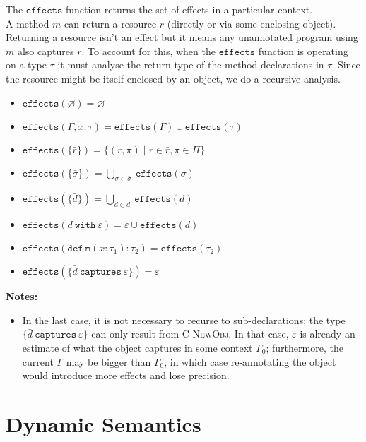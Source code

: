 \documentclass{llncs}
\newcommand{\keywadj}[1]{\mathtt{#1}}
\newcommand{\keyw}[1]{\keywadj{#1}~}
\begin{document}
\noindent
The $\keywadj{effects}$ function returns the set of effects in a particular context. \\

\noindent
A method $m$ can return a resource $r$ (directly or via some enclosing object). Returning a resource isn't an effect but it means any unannotated program using $m$ also captures $r$. To account for this, when the $\keywadj{effects}$ function is operating on a type $\tau$ it must analyse the return type of the method declarations in $\tau$. Since the resource might be itself enclosed by an object, we do a recursive analysis.

\begin{itemize}
	\item $\keywadj{effects}(\varnothing) = \varnothing$
	\item $\keywadj{effects}(\Gamma, x : \tau) = \keywadj{effects}(\Gamma) \cup \keywadj{effects}(\tau)$
	\item $\keywadj{effects}(\{\bar r\}) = \{ (r, \pi) \mid r \in \bar r, \pi \in \Pi \}$
	\item $\keywadj{effects}(\{\bar \sigma\}) = \bigcup_{\sigma \in \bar \sigma}~\keywadj{effects}(\sigma)$
	\item $\keywadj{effects}(\{\bar d\}) = \bigcup_{d \in \bar d}~\keywadj{effects}(d)$
	\item $\keywadj{effects}(d~\keyw{with} \varepsilon) = \varepsilon \cup \keywadj{effects}(d)$
	\item $\keywadj{effects}(\keywadj{def~m}(x : \tau_1) : \tau_2) = \keywadj{effects}(\tau_2)$
	\item $\keywadj{effects}(\{\bar d ~\keyw{captures} \varepsilon\}) = \varepsilon$
\end{itemize}

\noindent \textbf{Notes:}
\begin{itemize}
	\item In the last case, it is not necessary to recurse to sub-declarations; the type $\{ \bar d~\keyw{captures} \varepsilon \}$ can only result from \textsc{C-NewObj}. In that case, $\varepsilon$ is already an estimate of what the object captures in some context $\Gamma_0$; furthermore, the current $\Gamma$ may be bigger than $\Gamma_0$, in which case re-annotating the object would introduce more effects and lose precision.
\end{itemize}
\newpage


\section{Dynamic Semantics}
\end{document}
